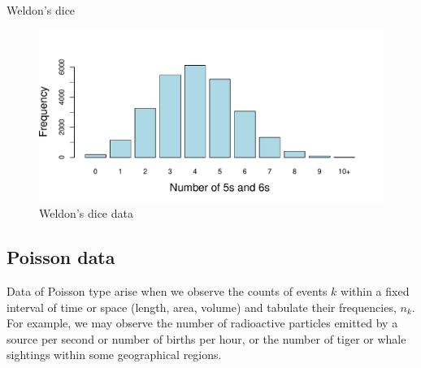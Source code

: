 \documentclass[11pt]{book}
\renewenvironment{knitrout}{\small\renewcommand{\baselinestretch}{.85}}{} %
\begin{document}
\begin{Example}[dice]{Weldon's dice}

\begin{knitrout}
\color{fgcolor}\begin{kframe}
\begin{alltt}
 \hlstd{=}\hlstd{)}
\hlopt{$}\hlstd{n56[}\hlstd{]} \hlkwb{<-} 
 \hlstd{=}\hlstd{,} \hlstd{=}\hlstd{,}
        \hlstd{=}\hlstd{,} \hlstd{=}\hlstd{)}
\end{alltt}
\end{kframe}\begin{figure}[!htbp]


\centerline{\includegraphics[width=.75\textwidth]{ch03/fig/dice} }

\caption[Weldon's dice data]{Weldon's dice data\label{fig:dice}}
\end{figure}


\end{knitrout}
\end{Example}

\subsection{Poisson data}\label{sec:pois-data}

Data of Poisson type arise when we observe the counts of events $k$ within a
fixed interval of time or space (length, area, volume) and tabulate their
frequencies, $n_k$.  For example, we may observe the number of radioactive
particles emitted by a source per second or number of births per hour,
or the number of tiger or whale sightings within some geographical regions.
\end{document}
